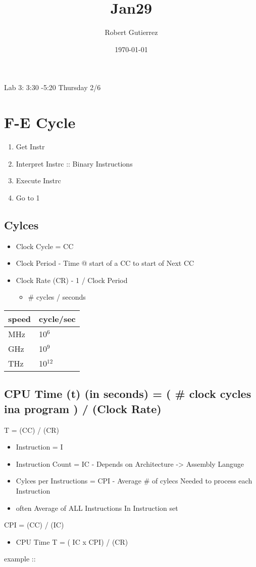 \documentclass[11pt]{article}
\author{Robert Gutierrez}
\date{\today}
\title{Jan29}
\begin{document}
\maketitle
\tableofcontents



Lab 3: 3:30 -5:20 Thursday 2/6

\section{F-E Cycle}
\label{sec-1}
\begin{enumerate}
\item Get Instr
\item Interpret Instrc  :: Binary Instructions
\item Execute Instrc
\item Go to 1
\end{enumerate}

\subsection{Cylces}
\label{sec-1-1}
\begin{itemize}
\item Clock Cycle = CC
\item Clock Period - Time @ start of a CC to start of Next CC
\item Clock Rate (CR) - 1 / Clock Period 
\begin{itemize}
\item \# cycles / seconds
\end{itemize}
\end{itemize}

\begin{center}
\begin{tabular}{ll}
speed & cycle/sec\\
\hline
MHz & 10$^{\text{6}}$\\
GHz & 10$^{\text{9}}$\\
THz & 10$^{\text{12}}$\\
\end{tabular}
\end{center}
\subsection{CPU Time (t) (in seconds) =   ( \# clock cycles ina  program ) / (Clock Rate)}
\label{sec-1-2}


T = (CC) / (CR) 
\begin{itemize}
\item Instruction = I
\item Instruction Count = IC - Depends on Architecture -> Assembly Languge
\item Cylces per Instructions = CPI - Average \# of cylecs  Needed to process each Instruction
\item often Average of ALL Instructions In Instruction set
\end{itemize}


CPI = (CC) / (IC) 

\begin{itemize}
\item CPU Time T = ( IC x CPI) / (CR)
\end{itemize}
example :: 
\end{document}
